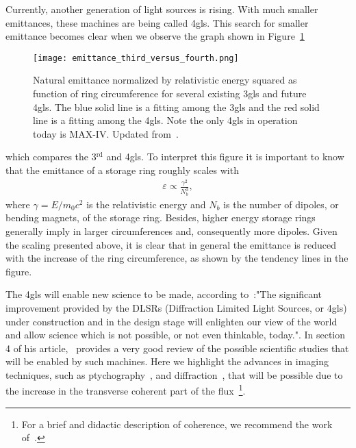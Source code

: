     Currently, another generation of light sources is rising. With much smaller emittances, these machines are being called \gls{4gls}.
    This search for smaller emittance becomes clear when we observe the graph shown in Figure~\ref{fig:scaled_emittances}
    \begin{figure}
        \center
        \texttt{[image: emittance\_third\_versus\_fourth.png]}
        \caption[Comparison of machines emittances.]{Natural emittance normalized by relativistic energy squared as function of ring circumference for several existing \gls{3gls} and future \gls{4gls}. The blue solid line is a fitting among the \gls{3gls} and the red solid line is a fitting among the \gls{4gls}. Note the only \gls{4gls} in operation today is MAX-IV. Updated from~\cite{Liu2017}.}
        \label{fig:scaled_emittances}
    \end{figure}
    which compares the 3$^\text{rd}$ and \gls{4gls}. To interpret this figure it is important to know that the emittance of a storage ring roughly scales with
    \begin{align}
        \varepsilon \propto \frac{\gamma^2}{N_b^3},
    \end{align}
    where $\gamma = E/m_0c^2$ is the relativistic energy and $N_b$ is the number of dipoles, or bending magnets, of the storage ring. Besides, higher energy storage rings generally imply in larger circumferences and, consequently more dipoles. Given the scaling presented above, it is clear that in general the emittance is reduced with the increase of the ring circumference, as shown by the tendency lines in the figure.

    The \gls{4gls} will enable new science to be made, according to~:"The significant improvement provided by the DLSRs (Diffraction Limited Light Sources, or \gls{4gls}) under construction and in the design stage will enlighten our view of the world and allow science which is not possible, or not even thinkable, today.". In section 4 of his article,~ provides a very good review of the possible scientific studies that will be enabled by such machines. Here we highlight the advances in imaging techniques, such as ptychography~\cite{Thibault2014}, and diffraction~\cite{Hitchcock2014}, that will be possible due to the increase in the transverse coherent part of the flux~\footnote{For a brief and didactic description of coherence, we recommend the work of~.}.

